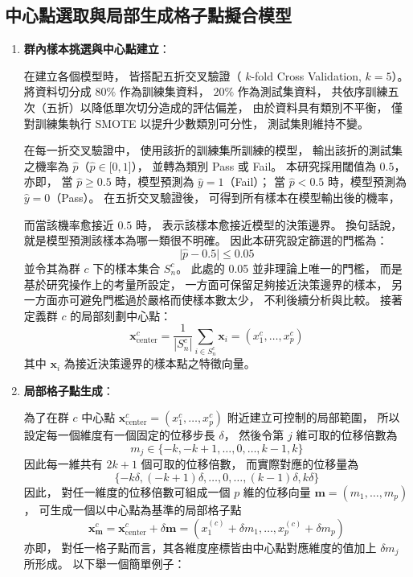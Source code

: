 \documentclass[12pt,a4paper,oneside]{book}
\begin{document}
	\subsection{中心點選取與局部生成格子點擬合模型}
	\label{sec:中心點選取與局部生成格子點擬合模型}
	\begin{enumerate}
		
	\item \textbf{群內樣本挑選與中心點建立}：

	在建立各個模型時，
	皆搭配五折交叉驗證（ $k$-fold Cross Validation, $k=5$）。
	將資料切分成 $80\%$ 作為訓練集資料，
	$20\%$ 作為測試集資料，
	共依序訓練五次（五折）以降低單次切分造成的評估偏差，
	由於資料具有類別不平衡，
	僅對訓練集執行 SMOTE 以提升少數類別可分性，
	測試集則維持不變。

	在每一折交叉驗證中，
	使用該折的訓練集所訓練的模型，
	輸出該折的測試集之機率為 $\hat{p}$（$\hat{p}\in [0,1$]），
	並轉為類別 Pass 或 Fail。
	本研究採用閾值為 $0.5$，
	亦即，
	當 $\hat{p}\ge 0.5$ 時，模型預測為 $\hat{y}=1$（Fail）；
	當 $\hat{p}<0.5$ 時，模型預測為 $\hat{y}=0$（Pass）。
	在五折交叉驗證後，
	可得到所有樣本在模型輸出後的機率，

	而當該機率愈接近 $0.5$ 時，
	表示該樣本愈接近模型的決策邊界。
	換句話說，
	就是模型預測該樣本為哪一類很不明確。
	因此本研究設定篩選的門檻為： $$\lvert \hat{p}-0.5\rvert \le 0.05$$ 
	並令其為群 $c$ 下的樣本集合 $S^c_n$。
	此處的 0.05 並非理論上唯一的門檻，
	而是基於研究操作上的考量所設定，
	一方面可保留足夠接近決策邊界的樣本，
	另一方面亦可避免門檻過於嚴格而使樣本數太少，
	不利後續分析與比較。
	接著定義群 $c$ 的局部刻劃中心點： $$\mathbf{x}^c_{\mathrm{center}}=\frac{1}{|S^c_n|}\sum_{i\in S^c_n}\mathbf{x}_i=(x^c_1,\dots,x^c_p)$$
	其中 $\mathbf{x}_i$ 為接近決策邊界的樣本點之特徵向量。

	\item \textbf{局部格子點生成}：

	為了在群 $c$ 中心點 $\mathbf{x}^c_{\mathrm{center}}=(x^c_1,\dots,x^c_p)$ 附近建立可控制的局部範圍，
	所以設定每一個維度有一個固定的位移步長 $\delta$，
	然後令第 $j$ 維可取的位移倍數為 $$m_j\in \{-k,-k+1,\dots,0,\dots,k-1,k\}$$
	因此每一維共有 $2k+1$ 個可取的位移倍數，
	而實際對應的位移量為 $$\{-k\delta,(-k+1)\delta,\dots , 0,\dots , (k-1)\delta, k\delta\}$$
	因此，
	對任一維度的位移倍數可組成一個 $p$ 維的位移向量
	$\mathbf{m}=(m_1,\dots,m_p)$，
	可生成一個以中心點為基準的局部格子點
	$$\mathbf{x}^c_{\mathbf{m}}=\mathbf{x}^c_{\mathrm{center}}+\delta \mathbf{m}=(x^{(c)}_1+\delta m_1,\dots,x^{(c)}_p+\delta m_p)$$
	亦即，
	對任一格子點而言，其各維度座標皆由中心點對應維度的值加上 $\delta m_j$ 所形成。
	以下舉一個簡單例子：


\end{enumerate}
\end{document}
